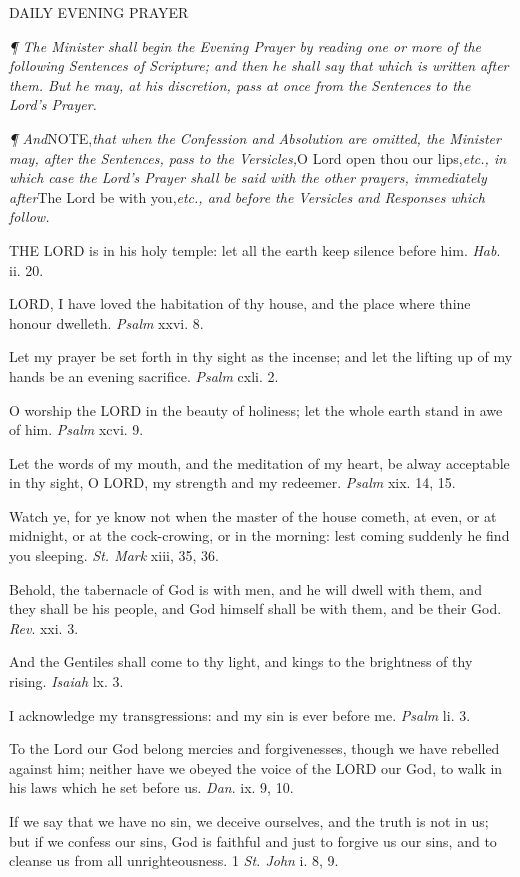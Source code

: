 DAILY
EVENING PRAYER

\emph{¶
The Minister shall begin the Evening Prayer by reading one or more of
the following Sentences of Scripture; and then he shall say that which
is written after them. But he may, at his discretion, pass at once from
the Sentences to the Lord’s Prayer.}

\emph{¶
And}NOTE,\emph{that when the Confession and
Absolution are omitted, the Minister may, after the Sentences, pass to
the Versicles,}O Lord open thou our lips,\emph{etc., in which case
the Lord's Prayer shall be said with the other prayers, immediately after}The Lord be with you,\emph{etc., and before the Versicles and Responses
which follow.}

THE
LORD is in his holy temple: let all the earth keep
silence before him. \emph{Hab}. ii. 20.

LORD, I have loved the habitation
of thy house, and the place where thine honour dwelleth. \emph{Psalm}
xxvi. 8.

Let my prayer be set forth in thy sight as the incense;
and let the lifting up of my hands be an evening sacrifice. \emph{Psalm}
cxli. 2.

O worship the LORD in the beauty
of holiness; let the whole earth stand in awe of him. \emph{Psalm}
xcvi. 9.

Let the words of my mouth, and the meditation of my
heart, be alway acceptable in thy sight, O LORD,
my strength and my redeemer. \emph{Psalm} xix. 14, 15.

Watch
ye, for ye know not when the master of the house cometh, at even, or at
midnight, or at the cock-crowing, or in the morning: lest coming suddenly
he find you sleeping. \emph{St. Mark} xiii, 35, 36. 

Behold,
the tabernacle of God is with men, and he will dwell with them, and they
shall be his people, and God himself shall be with them, and be their
God. \emph{Rev}. xxi. 3.

And the Gentiles shall come to thy light, and kings to the brightness
of thy rising. \emph{Isaiah} lx. 3.

I acknowledge my transgressions: and my sin is ever before me. \emph{Psalm}
li. 3.

To the Lord our God belong mercies and forgivenesses,
though we have rebelled against him; neither have we obeyed the voice
of the LORD our God, to walk in his laws which
he set before us. \emph{Dan}. ix. 9, 10.

If we say that we have no sin, we deceive ourselves,
and the truth is not in us; but if we confess our sins, God is faithful
and just to forgive us our sins, and to cleanse us from all unrighteousness.
1 \emph{St. John} i. 8, 9.

